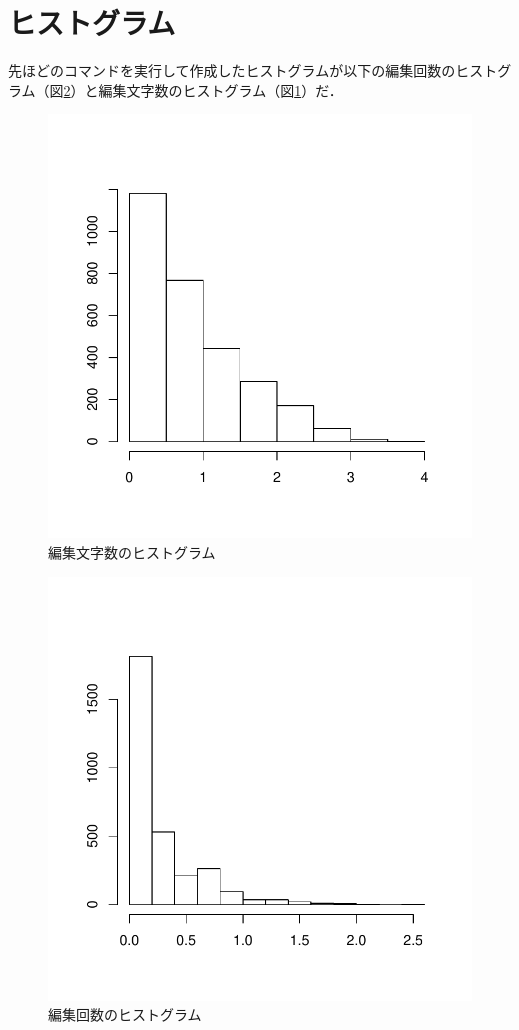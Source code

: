 \begin{verbatim}
\end{verbatim}

\section{ヒストグラム}

先ほどのコマンドを実行して作成したヒストグラムが以下の編集回数のヒストグラム（図\ref{K}）と編集文字数のヒストグラム（図\ref{M}）だ．

\begin{figure}[thbp]
   \includegraphics[width=13cm]{logm.pdf}
   \caption{編集文字数のヒストグラム}
   \label{M}
\end{figure}

\begin{figure}[thbp]
   \includegraphics[width=13cm]{logk.pdf}
   \caption{編集回数のヒストグラム}
   \label{K}
 \end{figure}
 
